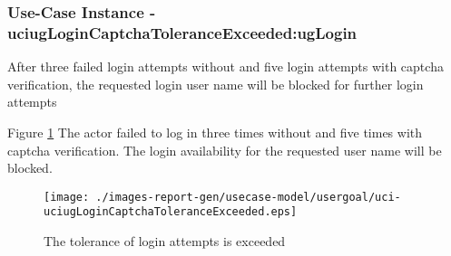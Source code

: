 
	\subsubsection{Use-Case Instance - uciugLoginCaptchaToleranceExceeded:ugLogin}
	
	After three failed login attempts without and five login attempts with captcha verification, the requested login user name will be blocked for further login attempts		  
	\begin{operationmodel}
	
	\end{operationmodel} 

	
	Figure \ref{fig:lu.uni.lassy.excalibur.examples.icrash-RE-UC-uci-uciugLoginCaptchaToleranceExceeded}
	The actor failed to log in three times without and five times with captcha verification. The login availability for the requested user name will be blocked.
	
	\begin{figure}[htbp]
	\begin{center}
	
	\texttt{[image: ./images-report-gen/usecase-model/usergoal/uci-uciugLoginCaptchaToleranceExceeded.eps]}
	\end{center}
	\caption[lu.uni.lassy.excalibur.examples.icrash Sequence Diagram: uci-uciugLoginCaptchaToleranceExceeded]{The tolerance of login attempts is exceeded}
	\label{fig:lu.uni.lassy.excalibur.examples.icrash-RE-UC-uci-uciugLoginCaptchaToleranceExceeded}
	\end{figure}
	\vspace{0.5cm}
